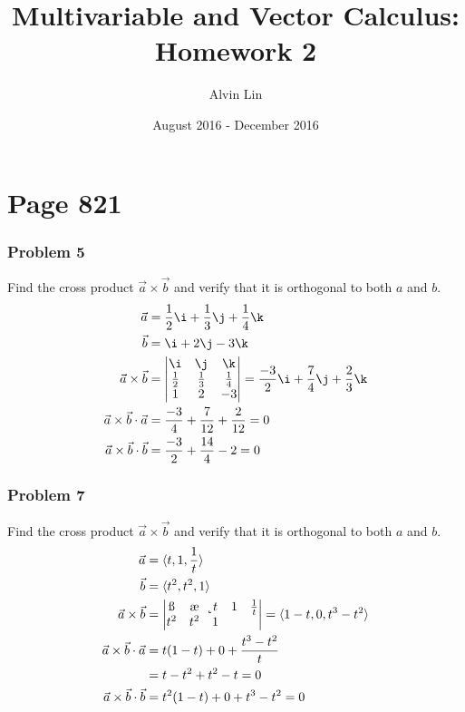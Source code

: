 \documentclass[letterpaper, 12pt]{math}
\title{Multivariable and Vector Calculus: Homework 2}
\author{Alvin Lin}
\date{August 2016 - December 2016}
\begin{document}
\maketitle

\section*{Page 821}

\subsubsection*{Problem 5}
Find the cross product \( \vec{a}\times\vec{b} \) and verify that it is
orthogonal to both \( a \) and \( b \).
\begin{align*}
  \vec{a} &= \frac{1}{2}\i+\frac{1}{3}\j+\frac{1}{4}\k \\
  \vec{b} &= \i+2\j-3\k \\
  \vec{a}\times\vec{b} &= \begin{vmatrix}
    \i & \j & \k \\
    \frac{1}{2} & \frac{1}{3} & \frac{1}{4} \\
    1 & 2 & -3
  \end{vmatrix} = \frac{-3}{2}\i+\frac{7}{4}\j+\frac{2}{3}\k \\
  \vec{a}\times\vec{b}\cdot\vec{a} &=
    \frac{-3}{4}+\frac{7}{12}+\frac{2}{12} = 0 \\
  \vec{a}\times\vec{b}\cdot\vec{b} &=
    \frac{-3}{2}+\frac{14}{4}-2 = 0
\end{align*}

\subsubsection*{Problem 7}
Find the cross product \( \vec{a}\times\vec{b} \) and verify that it is
orthogonal to both \( a \) and \( b \).
\begin{align*}
  \vec{a} &= \langle t,1,\frac{1}{t}\rangle \\
  \vec{b} &= \langle t^2,t^2,1\rangle \\
  \vec{a}\times\vec{b} &= \begin{vmatrix}
    \i & \j & \k \\
    t & 1 & \frac{1}{t} \\
    t^2 & t^2 & 1
  \end{vmatrix} = \langle1-t,0,t^3-t^2\rangle \\
  \vec{a}\times\vec{b}\cdot\vec{a} &=
    t(1-t)+0+\frac{t^3-t^2}{t} \\
  &= t-t^2+t^2-t = 0 \\
  \vec{a}\times\vec{b}\cdot\vec{b} &=
    t^2(1-t)+0+t^3-t^2 = 0
\end{align*}
\end{document}
